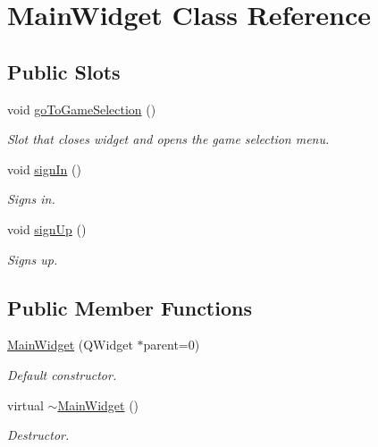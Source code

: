 \hypertarget{classMainWidget}{\section{\-Main\-Widget \-Class \-Reference}
\label{classMainWidget}
}
\subsection*{\-Public \-Slots}
\begin{DoxyCompactItemize}
\item 
void \hyperlink{classMainWidget_a438fbcb90c6dcb9301d70c5b34d98900}{go\-To\-Game\-Selection} ()
\begin{DoxyCompactList}\small\item\em \-Slot that closes widget and opens the game selection menu. \end{DoxyCompactList}\item 
void \hyperlink{classMainWidget_ac2762877342a5e4631c1f995d9ec42ed}{sign\-In} ()
\begin{DoxyCompactList}\small\item\em \-Signs in. \end{DoxyCompactList}\item 
void \hyperlink{classMainWidget_a8c973abf92ba1cb245a4f3f9f5eb9690}{sign\-Up} ()
\begin{DoxyCompactList}\small\item\em \-Signs up. \end{DoxyCompactList}\end{DoxyCompactItemize}
\subsection*{\-Public \-Member \-Functions}
\begin{DoxyCompactItemize}
\item 
\hyperlink{classMainWidget_a326fee5088b7cebaa102ed5332dd59ee}{\-Main\-Widget} (\-Q\-Widget $\ast$parent=0)
\begin{DoxyCompactList}\small\item\em \-Default constructor. \end{DoxyCompactList}\item 
virtual \hyperlink{classMainWidget_add21c63f8e799303a21a69da3d288c2f}{$\sim$\-Main\-Widget} ()
\begin{DoxyCompactList}\small\item\em \-Destructor. \end{DoxyCompactList}\end{DoxyCompactItemize}


